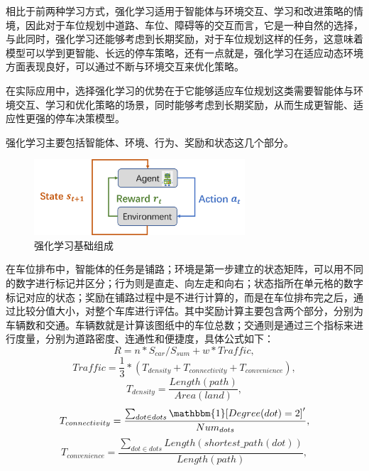 相比于前两种学习方式，强化学习适用于智能体与环境交互、学习和改进策略的情境，因此对于车位规划中道路、车位、障碍等的交互而言，它是一种自然的选择，与此同时，强化学习还能够考虑到长期奖励，对于车位规划这样的任务，这意味着模型可以学到更智能、长远的停车策略，还有一点就是，强化学习在适应动态环境方面表现良好，可以通过不断与环境交互来优化策略。

在实际应用中，选择强化学习的优势在于它能够适应车位规划这类需要智能体与环境交互、学习和优化策略的场景，同时能够考虑到长期奖励，从而生成更智能、适应性更强的停车决策模型。

强化学习主要包括智能体、环境、行为、奖励和状态这几个部分。
\begin{figure}[H]
  \centering
  \includegraphics[width=0.7\textwidth]{pictures/强化学习.png}
  \caption{强化学习基础组成}
  \label{fig:reinforcement_learning_component}
\end{figure}
在车位排布中，智能体的任务是铺路；环境是第一步建立的状态矩阵，可以用不同的数字进行标记并区分；行为则是直走、向左走和向右；状态指所在单元格的数字标记对应的状态；奖励在铺路过程中是不进行计算的，而是在车位排布完之后，通过比较分值大小，对整个车库进行评估。其中奖励计算主要包含两个部分，分别为车辆数和交通。车辆数就是计算该图纸中的车位总数；交通则是通过三个指标来进行度量，分别为道路密度、连通性和便捷度，具体公式如下：
\begin{equation}
  R=n*S_{car}/S_{sum}+w*Traffic,\label{reward}
\end{equation}
\begin{equation}
  Traffic=\frac{1}{3}*(T_{density}+T_{connectivity}+T_{convenience}),\label{reward_traffic}
\end{equation}
\begin{equation}
  T_{density}=\frac{Length(path)}{Area(land)},\label{reward_traffic_density}
\end{equation}
\begin{equation}
  T_{connectivity}=\frac{\sum_{dot \in dots}\mathbbm{1}[Degree(dot)=2]'}{Num_{dots}},\label{reward_traffic_connectivity}
\end{equation}
\begin{equation}
  T_{convenience}=\frac{\sum_{dot \in dots}{Length(shortest\_path(dot))}}{Length(path)},\label{reward_traffic_convenience}
\end{equation}

